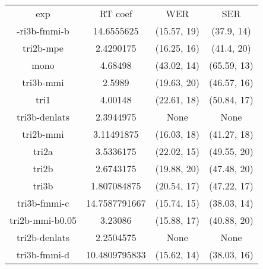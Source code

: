 \begin{tabular}{cccc}
exp             & RT coef       & WER         & SER        \\
-ri3b-fmmi-b    & 14.6555625    & (15.57, 19) & (37.9, 14) \\
tri2b-mpe       & 2.4290175     & (16.25, 16) & (41.4, 20) \\
mono            & 4.68498       & (43.02, 14) & (65.59, 13)\\
tri3b-mmi       & 2.5989        & (19.63, 20) & (46.57, 16)\\
tri1            & 4.00148       & (22.61, 18) & (50.84, 17)\\
tri3b-denlats   & 2.3944975     & None        & None       \\
tri2b-mmi       & 3.11491875    & (16.03, 18) & (41.27, 18)\\
tri2a           & 3.5336175     & (22.02, 15) & (49.55, 20)\\
tri2b           & 2.6743175     & (19.88, 20) & (47.48, 20)\\
tri3b           & 1.807084875   & (20.54, 17) & (47.22, 17)\\
tri3b-fmmi-c    & 14.7587791667 & (15.74, 15) & (38.03, 14)\\
tri2b-mmi-b0.05 & 3.23086       & (15.88, 17) & (40.88, 20)\\
tri2b-denlats   & 2.2504575     & None        & None       \\
tri3b-fmmi-d    & 10.4809795833 & (15.62, 14) & (38.03, 16)
\end{tabular}


